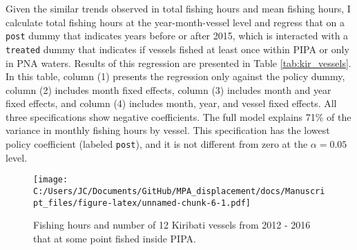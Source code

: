 \documentclass[]{article}
\theoremstyle{definition}
\theoremstyle{definition}
\theoremstyle{definition}
\theoremstyle{remark}
\begin{document}
\clearpage

Given the similar trends observed in total fishing hours and mean
fishing hours, I calculate total fishing hours at the year-month-vessel
level and regress that on a \texttt{post} dummy that indicates years
before or after 2015, which is interacted with a \texttt{treated} dummy
that indicates if vessels fished at least once within PIPA or only in
PNA waters. Results of this regression are presented in Table
\ref{tab:kir_vessels}. In this table, column (1) presents the regression
only against the policy dummy, column (2) includes month fixed effects,
column (3) includes month and year fixed effects, and column (4)
includes month, year, and vessel fixed effects. All three specifications
show negative coefficients. The full model explains 71\% of the variance
in monthly fishing hours by vessel. This specification has the lowest
policy coefficient (labeled \texttt{post}), and it is not different from
zero at the \(\alpha = 0.05\) level.

\begin{figure}
\centering
\texttt{[image: C:/Users/JC/Documents/GitHub/MPA\_displacement/docs/Manuscript\_files/figure-latex/unnamed-chunk-6-1.pdf]}
\caption{\label{fig:unnamed-chunk-6}\label{fig:kir_vessels}Fishing hours and
number of 12 Kiribati vessels from 2012 - 2016 that at some point fished
inside PIPA.}
\end{figure}
\end{document}
